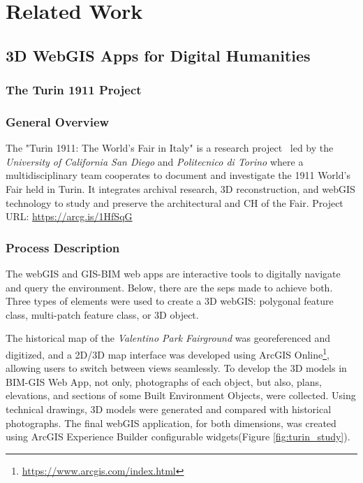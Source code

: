 
%


\chapter{Related Work}
\label{cha:related_work}


\section{3D WebGIS Apps for Digital Humanities}
\label{sec:webgis}

\subsection{The Turin 1911 Project}
\label{sec:turin_project} 


\subsection*{General Overview}

The "Turin 1911: The World's Fair in Italy" is a research project~\cite{spreafico20233d} led by the \textit{University of California San Diego} and  \textit{Politecnico di Torino} where a multidisciplinary team cooperates to document and investigate the 1911 World’s Fair held in Turin.
It integrates archival research, \gls{3D} reconstruction, and web\gls{GIS} technology to study and preserve the architectural and \gls{CH} of the Fair. Project URL: \url{https://arcg.is/1HfSqG} 

\subsection*{Process Description}

The web\gls{GIS} and \gls{GIS}-\gls{BIM} web apps are interactive tools to digitally navigate and query the environment. Below, there are the seps made to achieve both.
Three types of elements were used to create a \gls{3D} web\gls{GIS}: polygonal feature class, multi-patch feature class, or \gls{3D} object.

The historical map of the \textit{Valentino Park Fairground} was georeferenced and digitized, and a \gls{2D}/\gls{3D} map interface was developed using ArcGIS Online\footnote{\url{https://www.arcgis.com/index.html}}, allowing users to switch between views seamlessly. 
To develop the \gls{3D} models in \gls{BIM}-\gls{GIS} Web App, not only, photographs of each object, but also, plans, elevations, and sections of some Built Environment Objects, were collected. Using technical drawings, \gls{3D} models were generated and compared with historical photographs.
The final web\gls{GIS} application, for both dimensions, was created using ArcGIS Experience Builder configurable widgets(Figure \ref{fig:turin_study}).

